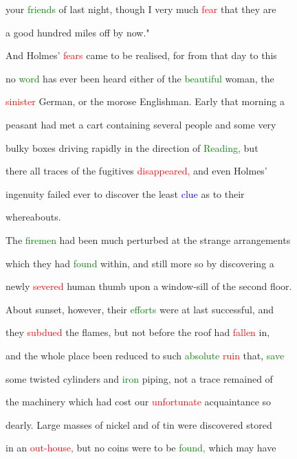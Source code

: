  your \textcolor{green}{friends} of last night, though I very much \textcolor{red}{fear} that they are

 a \textcolor{BurntOrange}{good} hundred miles off by now."



 And Holmes' \textcolor{red}{fears} came to be realised, for from that day to this

 no \textcolor{green}{word} has ever been heard either of the \textcolor{green}{beautiful} woman, the

 \textcolor{red}{sinister} German, or the morose Englishman. Early that morning a

 peasant had met a cart containing several people and some very

 bulky boxes driving rapidly in the direction of \textcolor{green}{Reading,} but

 there all traces of the \textcolor{BurntOrange}{fugitives} \textcolor{red}{disappeared,} and even Holmes'

 ingenuity failed ever to discover the least \textcolor{blue}{clue} as to their

 whereabouts.



 The \textcolor{green}{firemen} had been much perturbed at the strange arrangements

 which they had \textcolor{green}{found} within, and still more so by discovering a

 newly \textcolor{red}{severed} human thumb upon a window-sill of the second floor.

 About \textcolor{BurntOrange}{sunset,} however, their \textcolor{green}{efforts} were at last \textcolor{BurntOrange}{successful,} and

 they \textcolor{red}{subdued} the flames, but not before the roof had \textcolor{red}{fallen} in,

 and the whole place been reduced to such \textcolor{green}{absolute} \textcolor{red}{ruin} that, \textcolor{green}{save}

 some twisted cylinders and \textcolor{green}{iron} piping, not a trace remained of

 the machinery which had cost our \textcolor{red}{unfortunate} acquaintance so

 dearly. Large masses of nickel and of tin were discovered \textcolor{BurntOrange}{stored}

 in an \textcolor{red}{out-house,} but no coins were to be \textcolor{green}{found,} which may have

